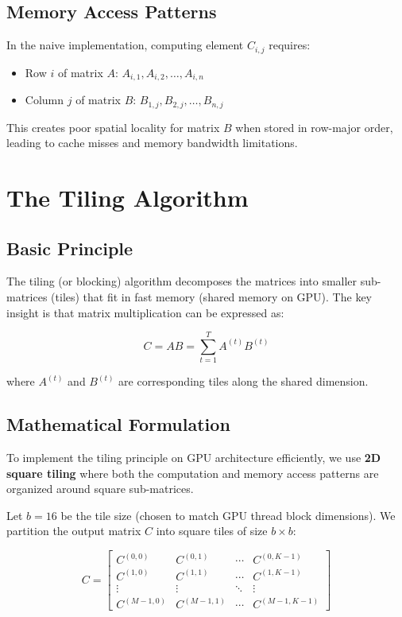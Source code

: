 \documentclass{amsbook}
\theoremstyle{definition}
\begin{document}
\subsection{Memory Access Patterns}

In the naive implementation, computing element $C_{i,j}$ requires:
\begin{itemize}
\item Row $i$ of matrix $A$: $A_{i,1}, A_{i,2}, \ldots, A_{i,n}$
\item Column $j$ of matrix $B$: $B_{1,j}, B_{2,j}, \ldots, B_{n,j}$
\end{itemize}

This creates poor spatial locality for matrix $B$ when stored in row-major order, leading to cache misses and memory bandwidth limitations.

\section{The Tiling Algorithm}

\subsection{Basic Principle}

The tiling (or blocking) algorithm decomposes the matrices into smaller sub-matrices (tiles) that fit in fast memory (shared memory on GPU). The key insight is that matrix multiplication can be expressed as:

\begin{equation}
C = AB = \sum_{t=1}^{T} A^{(t)} B^{(t)}
\end{equation}

where $A^{(t)}$ and $B^{(t)}$ are corresponding tiles along the shared dimension.

\subsection{Mathematical Formulation}

To implement the tiling principle on GPU architecture efficiently, we use \textbf{2D square tiling} where both the computation and memory access patterns are organized around square sub-matrices.

Let $b = 16$ be the tile size (chosen to match GPU thread block dimensions). We partition the output matrix $C$ into square tiles of size $b \times b$:

\begin{equation}
C = \begin{bmatrix}
C^{(0,0)} & C^{(0,1)} & \cdots & C^{(0,K-1)} \\
C^{(1,0)} & C^{(1,1)} & \cdots & C^{(1,K-1)} \\
\vdots & \vdots & \ddots & \vdots \\
C^{(M-1,0)} & C^{(M-1,1)} & \cdots & C^{(M-1,K-1)}
\end{bmatrix}
\end{equation}
\end{document}
